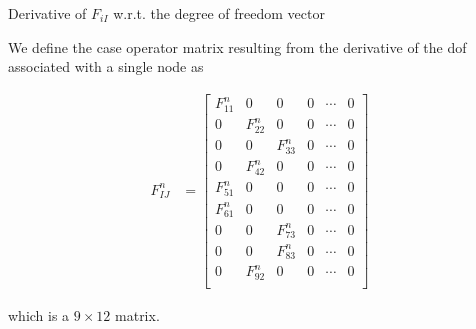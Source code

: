 \documentclass[11pt]{beamer}
\begin{document}
\begin{frame}{Derivative of $F_{iI}$ w.r.t. the degree of freedom vector}

We define the case operator matrix resulting from the derivative of the dof associated with a single node as

\begin{align*}
F_{IJ}^n &= \left[\begin{array}{cccccc}
F_{11}^n & 0 & 0 & 0 & \cdots & 0\\
0 & F_{22}^n & 0 & 0 & \cdots & 0\\
0 & 0 & F_{33}^n & 0 & \cdots & 0\\
0 & F_{42}^n & 0 & 0 & \cdots & 0\\
F_{51}^n & 0 & 0 & 0 & \cdots & 0\\
F_{61}^n & 0 & 0 & 0 & \cdots & 0\\
0 & 0 & F_{73}^n & 0 & \cdots & 0\\
0 & 0 & F_{83}^n & 0 & \cdots & 0\\
0 & F_{92}^n & 0 & 0 & \cdots & 0\\
\end{array}\right]
\end{align*}

which is a $9\times 12$ matrix.

\end{frame}
\end{document}
